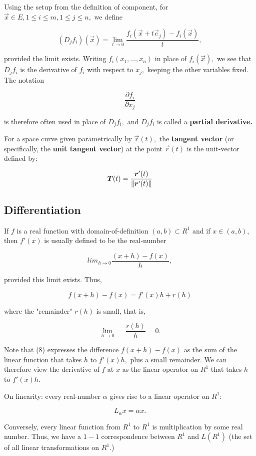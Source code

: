 \documentclass{article}
\begin{document}
\begin{definition}
Using the setup from the definition of \@{component}, for $\vec{x} \in E, 1 \leq i \leq m, 1 \leq j \leq n,$ we define

\[ (D_j f_i)(\vec{x}) = \lim_{t \to 0} \frac{f_i(\vec{x} + t \vec{e}_j) - f_i(\vec{x})}{t}, \]

provided the \@{limit} exists. Writing $f_i(x_1, \dots, x_n)$ in place of $f_i(\vec{x}),$ we see that $D_j f_i$ is the derivative of $f_i$ with respect to $x_j,$ keeping the other variables fixed. The notation

\[ \frac{\partial f_i}{\partial x_j} \]

is therefore often used in place of $D_j f_i,$ and $D_j f_i$ is called a \textbf{partial derivative.}
\end{definition}

\begin{definition}
For a space curve given parametrically by $\vec{r}(t),$ the \textbf{tangent vector} (or specifically, the \textbf{unit tangent vector}) at the point $\vec{r}(t)$ is the \@{unit-vector} defined by:

\[ \boldsymbol{T}(t) = \frac{\boldsymbol{r}'(t)}{\left\lVert \boldsymbol{r}'(t) \right\rVert} \]
\end{definition}

\subsection{Differentiation}
\begin{remark}
If $f$ is a real \@{function} with \@{domain-of-definition} $(a, b) \subset R^1$ and if $x \in (a,b),$ then $f'(x)$ is usually defined to be the \@{real-number}

\[ lim_{h \to 0} \frac{(x+h) - f(x)}{h}, \]

provided this \@{limit} exists. Thus,

\[ f(x + h) - f(x) = f'(x)h + r(h) \tag{8} \]

where the "remainder" $r(h)$ is small, that is,

\[ \lim_{h \to 0} = \frac{r(h)}{h} = 0. \]

Note that (8) expresses the difference $f(x+h) - f(x)$ as the sum of the linear \@{function} that takes $h$ to $f'(x)h,$ plus a small remainder. We can therefore view the derivative of $f$ at $x$ as the linear operator on $R^1$ that takes $h$ to $f'(x)h.$
\end{remark}

\begin{note}
On linearity: every \@{real-number} $\alpha$ gives rise to a linear operator on $R^1:$

\[ L_\alpha{x} = \alpha x. \]

Conversely, every linear function from $R^1$ to $R^1$ is multiplication by some real number. Thus, we have a $1-1$ correspondence between $R^1$ and $L(R^1)$ (the set of all linear transformations on $R^1$.)
\end{note}
\end{document}
